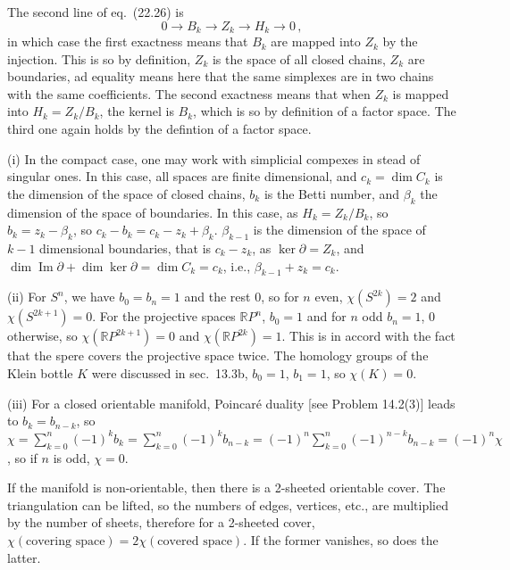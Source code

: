 \documentclass[a4paper,12pt]{article}
\renewcommand\Im{\mathop{\text{Im}}}
\begin{document}
The second line of eq.\ (22.26) is
\[
 0 \to B_k \to Z_k \to H_k \to 0\,,
\]
in which case the first exactness means that $B_k$ are mapped into $Z_k$ by the injection. This is so by definition, $Z_k$ is the space of all closed chains, $Z_k$ are boundaries, ad equality means here that the same simplexes are in two chains with the same coefficients. The second exactness means that when $Z_k$ is mapped into $H_k = Z_k/B_k$, the kernel is $B_k$, which is so by definition of a factor space. The third one again holds by the defintion of a factor space.

(i) In the compact case, one may work with simplicial compexes in stead of singular ones. In this case, all spaces are finite dimensional, and $c_k=\dim C_k$ is the dimension of the space of closed chains, $b_k$ is the Betti number, and $\beta_k$ the dimension of the space of boundaries. In this case, as $H_k = Z_k/B_k$, so $b_k = z_k - \beta_k$, so $c_k - b_k = c_k - z_k + \beta_k$. $\beta_{k-1}$ is the dimension of the space of $k-1$ dimensional boundaries, that is $c_k - z_k$, as $\ker\partial = Z_k$, and $\dim \Im \partial + \dim \ker \partial = \dim C_k = c_k$, i.e., $\beta_{k-1} + z_k = c_k$.


(ii) For $S^n$, we have $b_0 = b_n = 1$ and the rest 0, so for $n$ even, $\chi(S^{2k}) = 2$ and $\chi(S^{2k+1})=0$. For the projective spaces $\mathbb{R}P^n$, $b_0=1$ and for $n$ odd $b_n=1$, 0 otherwise, so $\chi(\mathbb{R}P^{2k+1}) = 0$ and $\chi(\mathbb{R}P^{2k}) = 1$. This is in accord with the fact that the spere covers the projective space twice. The homology groups of the Klein bottle $K$ were discussed in sec.\ 13.3b, $b_0=1$, $b_1=1$, so $\chi(K)=0$.

(iii) For a closed orientable manifold, Poincaré duality [see Problem 14.2(3)] leads to $b_k=b_{n-k}$, so $\chi = \sum_{k=0}^n (-1)^k b_k = \sum_{k=0}^n (-1)^k b_{n-k} = (-1)^n\sum_{k=0}^n (-1)^{n-k}b_{n-k}= (-1)^n \chi$, so if $n$ is odd, $\chi=0$.

If the manifold is non-orientable, then there is a 2-sheeted orientable cover. The triangulation can be lifted, so the numbers of edges, vertices, etc., are multiplied by the number of sheets, therefore for a 2-sheeted cover, $\chi(\text{covering space}) = 2\chi(\text{covered space})$. If the former vanishes, so does the latter.

\end{document}
